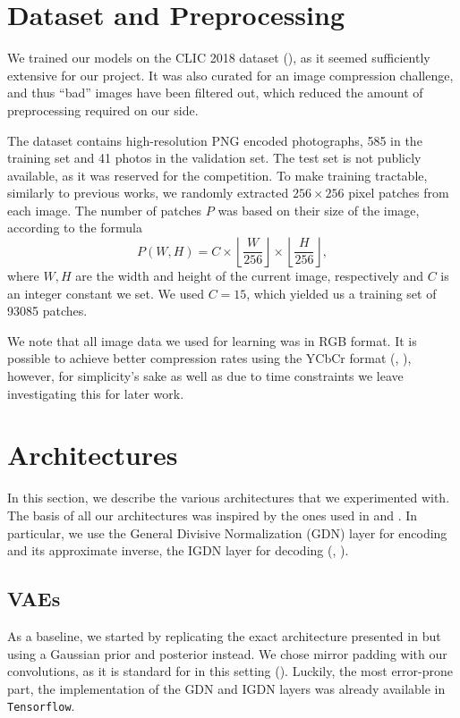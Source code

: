 \section{Dataset and Preprocessing}
\label{sec:dataset_preproc}
\par
We trained our models on the CLIC 2018 dataset (\cite{clic2018}), as it seemed
sufficiently extensive for our project. It was also curated for an image
compression challenge, and thus ``bad'' images have been
filtered out, which reduced the amount of preprocessing required on our side.
\par
The dataset contains high-resolution PNG encoded photographs, 585 in the
training set and 41 photos in the validation set. The test set is not
publicly available, as it was reserved for the competition. 
To make training tractable, similarly to previous works, we randomly extracted
$256 \times 256$ pixel patches from each image. The number of patches $P$ was
based on their size of the image, according to the formula
\[
  P(W, H) = C \times \left \lfloor \frac{W}{256} \right \rfloor \times
  \left \lfloor \frac{H}{256} \right \rfloor,
\]
where $W, H$ are the width and height of the current image, respectively and $C$
is an integer constant we set. We used $C = 15$, which yielded us a training set
of 93085 patches.
\par
We note that all image data we used for learning was in RGB format. It is
possible to achieve better compression rates using the YCbCr format
(\cite{balle2016end}, \cite{rippel2017real}), however, for simplicity's sake as
well as due to time constraints we leave investigating this for later work.
\section{Architectures}
\label{sec:architectures}
\par
In this section, we describe the various architectures that we experimented with.
The basis of all our architectures was inspired by the ones used in
\cite{balle2016end} and \cite{balle2018variational}. In particular, we use the
General Divisive Normalization (GDN) layer for encoding and its approximate
inverse, the IGDN layer for decoding (\cite{balle2015density}, \cite{balle2016end}).

\subsection{VAEs}
\label{sec:method_vaes}
\par
As a baseline, we started by replicating the exact architecture
presented in \cite{balle2016end} but using a Gaussian prior and posterior
instead. We chose mirror padding with our convolutions, as it is standard
for in this setting (\cite{theis2017lossy}). Luckily, the most
error-prone part, the implementation of the GDN and IGDN layers was already
available in \texttt{Tensorflow}\footnotemark.

